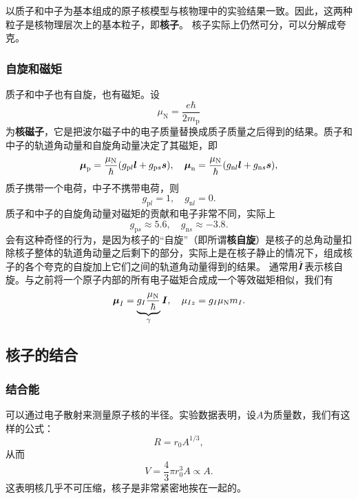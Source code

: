 \documentclass[UTF8, a4paper]{ctexart}
\begin{document}
以质子和中子为基本组成的原子核模型与核物理中的实验结果一致。因此，这两种粒子是核物理层次上的基本粒子，即\textbf{核子}。
核子实际上仍然可分，可以分解成夸克。

\subsubsection{自旋和磁矩}

质子和中子也有自旋，也有磁矩。设
\begin{equation}
    \mu_\text{N} = \frac{e \hbar}{2 m_\text{p}}
\end{equation}
为\textbf{核磁子}，它是把波尔磁子中的电子质量替换成质子质量之后得到的结果。质子和中子的轨道角动量和自旋角动量决定了其磁矩，即
\begin{equation}
    \vb*{\mu}_\text{p} = \frac{\mu_\text{N}}{\hbar} (g_{\text{p} l} \vb*{l} + g_{\text{p} s} \vb*{s}), \quad 
    \vb*{\mu}_\text{n} = \frac{\mu_\text{N}}{\hbar} (g_{\text{n} l} \vb*{l} + g_{\text{n} s} \vb*{s}),
\end{equation}
质子携带一个电荷，中子不携带电荷，则
\begin{equation}
    g_{\text{p}l} = 1, \quad g_{\text{n} l} = 0.
\end{equation}
质子和中子的自旋角动量对磁矩的贡献和电子非常不同，实际上
\begin{equation}
    g_{\text{p} s} \approx 5.6, \quad g_{\text{n} s} \approx -3.8.
\end{equation}
会有这种奇怪的行为，是因为核子的“自旋”（即所谓\textbf{核自旋}）是核子的总角动量扣除核子整体的轨道角动量之后剩下的部分，实际上是在核子静止的情况下，组成核子的各个夸克的自旋加上它们之间的轨道角动量得到的结果。
通常用$\hat{\vb*{I}}$表示核自旋。与之前将一个原子内部的所有电子磁矩合成成一个等效磁矩相似，我们有
\begin{equation}
    \vb*{\mu}_I = \underbrace{g_I \frac{\mu_\text{N}}{\hbar}}_\gamma \vb*{I}, \quad \mu_{Iz} = g_I \mu_\text{N} m_I.
\end{equation}

\subsection{核子的结合}

\subsubsection{结合能}

可以通过电子散射来测量原子核的半径。实验数据表明，设$A$为质量数，我们有这样的公式：
\begin{equation}
    R = r_0 A^{1/3},
\end{equation}
从而
\[
    V = \frac{4}{3} \pi r_0^3 A \propto A.
\]
这表明核几乎不可压缩，核子是非常紧密地挨在一起的。
\end{document}
